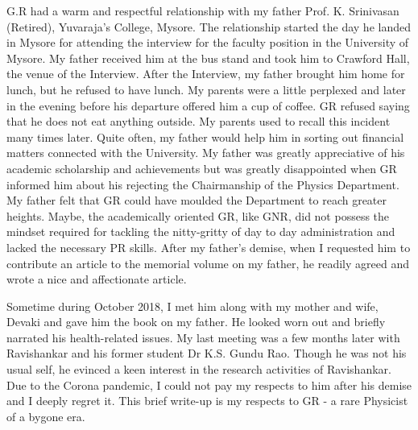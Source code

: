 G.R had a warm and respectful relationship with my father Prof. K. Srinivasan (Retired), Yuvaraja's College, Mysore. The relationship started the day he landed in Mysore for attending the interview for the faculty position in the University of Mysore. My father received him at the bus stand and took him to Crawford Hall, the venue of the Interview. After the Interview, my father brought him home for lunch, but he refused to have lunch. My parents were a little perplexed and later in the evening before his departure offered him a cup of coffee.  GR refused saying that he does not eat anything outside. My parents used to recall this incident many times later. Quite often, my father would help him in sorting out financial matters connected with the University. My father was greatly appreciative of his academic scholarship and achievements but was greatly disappointed when GR informed him about his rejecting the Chairmanship of the Physics Department. My father felt that GR could have moulded the Department to reach greater heights.  Maybe, the academically oriented GR, like GNR, did not possess the mindset required for tackling the nitty-gritty of day to day administration and lacked the necessary PR skills. After my father’s demise, when I requested him to contribute an article to the memorial volume on my father, he readily agreed and wrote a nice and affectionate article.

Sometime during October 2018, I met him along with my mother and wife, Devaki and gave him the book on my father. He looked worn out and briefly narrated his health-related issues. My last meeting was a few months later with Ravishankar and his former student Dr K.S. Gundu Rao. Though he was not his usual self, he evinced a keen interest in the research activities of Ravishankar. Due to the Corona pandemic, I could not pay my respects to him after his demise and I deeply regret it. This brief write-up is my respects to GR - a rare Physicist of a bygone era.



